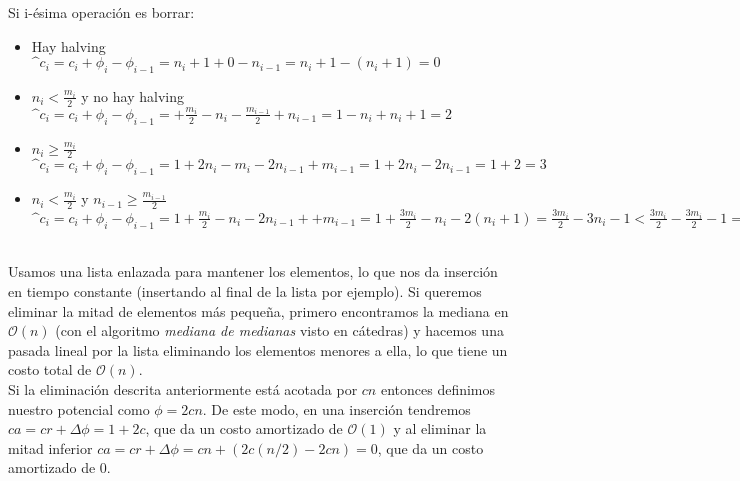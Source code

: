 \documentclass[dcc,uchile]{fcfmcourse}
\begin{document}
\begin{problems}
\begin{enumerate}[a)]
\begin{itemize}
        Si i-ésima operación es borrar:
        \begin{itemize}
            \item Hay halving \\
             $\^c_i=c_i + \phi_i - \phi_{i-1} = n_i + 1 + 0 - n_{i-1} = n_i + 1 - (n_i + 1) = 0 $
             \item $n_i < \frac{m_i}{2}$ y no hay halving \\
              $\^c_i=c_i + \phi_i - \phi_{i-1} =  + \frac{m_i}{2} - n_i - \frac{m_{i-1}}{2}+n_{i-1} = 1 - n_i + n_i + 1=2$
              \item $n_i \ge \frac{m_i}{2}$
               $\^c_i=c_i + \phi_i - \phi_{i-1} = 1 + 2n_i - m_i -2n_{i-1} + m_{i-1} = 1 + 2n_i - 2n_{i-1} = 1 + 2 = 3 $
               \item $n_i < \frac{m_i}{2} $ y $n_{i-1} \ge \frac{m_{i-1}}{2}$ \\
                $\^c_i=c_i + \phi_i - \phi_{i-1} = 1 + \frac{m_i}{2} - n_i -2n_{i-1} ++ m_{i-1} = 1 + \frac{3m_i}{2} - n_i - 2(n_i +1) = \frac{3m_i}{2} - 3n_i - 1 < \frac{3m_i}{2} - \frac{3m_i}{2} - 1 = -1 $
            
        \end{itemize}
    \end{itemize}
\end{enumerate}

\\
Usamos una lista enlazada para mantener los elementos, lo que nos da inserción en tiempo constante (insertando al final de la lista por ejemplo). Si queremos eliminar la mitad de elementos más pequeña, primero encontramos la mediana en $\mathcal{O}(n)$ (con el algoritmo \textit{mediana de medianas} visto en cátedras) y hacemos una pasada lineal por la lista eliminando los elementos menores a ella, lo que tiene un costo total de $\mathcal{O}(n)$.\\

Si la eliminación descrita anteriormente está acotada por $cn$ entonces definimos nuestro potencial como $\phi = 2cn$. De este modo, en una inserción tendremos $ca = cr +\Delta \phi = 1 + 2c$, que da un costo amortizado de $\mathcal{O}(1)$ y al eliminar la mitad inferior $ca = cr + \Delta \phi = cn + (2c(n/2)-2cn) = 0$, que da un costo amortizado de $0$.
\end{problems}
\end{document}
